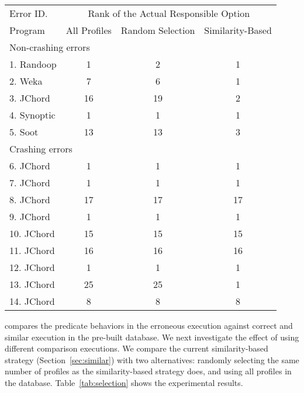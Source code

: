 \begin{table}[t]
\setlength{\tabcolsep}{.24\tabcolsep}
\begin{tabular}{|l|c|c||c|}
\hline
 Error ID. & \multicolumn{3}{|c|}{Rank of the Actual Responsible Option } \\
\cline{2-4}
 Program & All Profiles & Random Selection&  Similarity-Based\\
 \hline
\hline
\multicolumn{4}{|l|}{Non-crashing errors}   \\
 \hline
 1. Randoop & 1 & 2 & 1\\
 2. Weka & 7 & 6 & 1\\
 3. JChord & 16 & 19 & 2\\
 4. Synoptic & 1 & 1 & 1\\
 5. Soot & 13 & 13 & 3\\
\hline
\hline
\multicolumn{4}{|l|}{Crashing errors}   \\
\hline
 6. JChord & 1 & 1 &1\\
 7. JChord & 1 & 1 &1\\
 8. JChord & 17 & 17 &17\\
 9. JChord & 1 &  1&1\\
 10. JChord & 15 & 15 &15\\
 11. JChord & 16 & 16 &16\\
 12. JChord & 1 & 1 &1\\
 13. JChord & 25 & 25 &1\\
 14. JChord & 8 & 8 &8\\
\hline
\end{tabular}

\end{table}


\ourtool compares the predicate behaviors in the erroneous execution against
correct and similar execution in the pre-built database.
We next investigate the effect of using different comparison
executions. We compare the current similarity-based strategy
 (Section~\ref{sec:similar}) with two alternatives: randomly selecting the same number of
profiles as the similarity-based strategy does, and using
all profiles in the database. Table~\ref{tab:selection} shows the experimental results.

